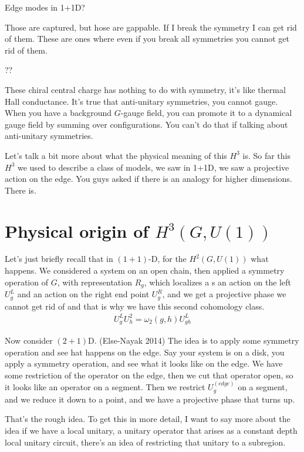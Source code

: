 \begin{question}
    Edge modes in 1+1D?
\end{question}
Those are captured,
but hose are gappable.
If I break the symmetry I can get rid of them.
These are ones where even if you break all symmetries you cannot get rid of
them.

\begin{question}
    ??
\end{question}
These chiral central charge has nothing to do with symmetry,
it's like thermal Hall conductance.
It's true that anti-unitary symmetries,
you cannot gauge.
When you have a background $G$-gauge field,
you can promote it to a dynamical gauge field by summing over configurations.
You can't do that if talking about anti-unitary symmetries.

Let's talk a bit more about what the physical meaning of this $H^3$ is.
So far this $H^3$ we used to describe a class of models,
we saw in 1+1D,
we saw a projective action on the edge.
You guys asked if there is an analogy for higher dimensions.
There is.

\section{Physical origin of $H^3(G, U(1))$}
Let's just briefly recall that in $(1+1)$-D,
for the $H^2(G, U(1))$ what happens.
We considered a system on an open chain,
then applied a symmetry operation of $G$,
with representation $R_g$,
which localizes a s an action on the left $U_g^L$ and an action on the right end
point $U_g^R$,
and we get a projective phase we cannot get rid of and that is why we have this
second cohomology class.
\begin{align}
    U_g^L U_h^2
    =
    \omega_2(g, h)
    U_{gh}^L
\end{align}

Now consider $(2+1)$D. (Else-Nayak 2014)
The idea is to apply some symmetry operation and see hat happens on the edge.
Say your system is on a disk,
you apply a symmetry operation,
and see what it looks like on the edge.
We have some restriction of the operator on the edge,
then we cut that operator open,
so it looks like an operator on a segment.
Then we restrict $U_g^{\left( edge \right)}$
on a segment,
and we reduce it down to a point,
and we have a projective phase that turns up.

That's the rough idea.
To get this in more detail,
I want to say more about the idea 
if we have a local unitary,
a unitary operator that arises as a constant depth local unitary circuit,
there's an idea of restricting that unitary to a subregion.

